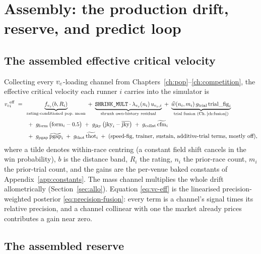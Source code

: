 \chapter{Assembly: the production drift, reserve, and predict loop}
\label{ch:assembly}

\section{The assembled effective critical velocity}

Collecting every ${v_{c}}$-loading channel from Chapters~\ref{ch:pop}--\ref{ch:competition}, the
effective critical velocity each runner $i$ carries into the simulator is
\begin{align}
  \vc^{\mathrm{eff}}_i \;=\;\;
   & \underbrace{f_{\vc}(b, R_i)}_{\text{rating-conditioned pop.\ mean}}
   \;+\; \underbrace{\texttt{SHRINK\_MULT}\cdot\lambda_{\vc}(n_i)\,u_{\vc,i}}_{\text{shrunk own-history residual}}
   \;+\; \underbrace{\widehat w(n_i,m_i)\,g_{\text{trial}}\,\mathrm{trial\_fig}_i}_{\text{trial fusion (Ch.\,\ref{ch:fusion})}}
   \nonumber\\[1mm]
   &\;+\; g_{\text{form}}\,\bigl(\mathrm{form}_i - 0.5\bigr)
   \;+\; g_{\text{jky}}\,\bigl(\mathrm{jky}_i - \overline{\mathrm{jky}}\bigr)
   \;+\; g_{\text{collat}}\,\widetilde{\mathrm{cfm}}_i
   \nonumber\\[1mm]
   &\;+\; g_{\text{pgap}}\,\widetilde{\mathrm{pgap}}_i
   \;+\; g_{\text{thot}}\,\widetilde{\mathrm{thot}}_i
   \;+\; (\text{speed-fig, trainer, sustain, additive-trial terms, mostly off}),
  \label{eq:vc-eff}
\end{align}
where a tilde denotes within-race centring (a constant field shift cancels in the win
probability), $b$ is the distance band, $R_i$ the rating, $n_i$ the prior-race count, $m_i$ the
prior-trial count, and the gains are the per-venue baked constants of Appendix~\ref{app:constants}.
The mass channel multiplies the whole drift allometrically (Section~\ref{sec:allo}). Equation
\eqref{eq:vc-eff} is the linearised precision-weighted posterior \eqref{eq:precision-fusion}:
every term is a channel's signal times its relative precision, and a channel collinear with one
the market already prices contributes a gain near zero.

\section{The assembled reserve}

